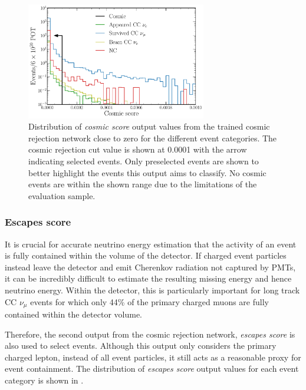 \begin{figure} %
    \includegraphics[width=0.7\textwidth]{diagrams/7-results/final_cosmic_zoomed_outputs.pdf}
    \caption[Distribution of cosmic score output values close to zero]
    {Distribution of \emph{cosmic score} output values from the trained cosmic rejection network
        close to zero for the different event categories. The cosmic rejection cut value is shown
        at 0.0001 with the arrow indicating selected events. Only preselected events are shown to
        better highlight the events this output aims to classify. No cosmic events are within the
        shown range due to the limitations of the evaluation sample.}
    \label{fig:cosmic_zoomed_outputs}
\end{figure}

\subsubsection*{Escapes score} %

It is crucial for accurate neutrino energy estimation that the activity of an event is fully
contained within the volume of the detector. If charged event particles instead leave the detector
and emit Cherenkov radiation not captured by PMTs, it can be incredibly difficult to estimate the
resulting missing energy and hence neutrino energy. Within the \chipsfive detector, this is
particularly important for long track CC $\nu_{\mu}$ events for which only 44\% of the primary
charged muons are fully contained within the detector volume.

Therefore, the second output from the cosmic rejection network, \emph{escapes score} is also used
to select events. Although this output only considers the primary charged lepton, instead of all
event particles, it still acts as a reasonable proxy for event containment. The distribution of
\emph{escapes score} output values for each event category is shown in
.

